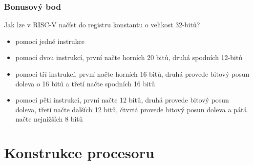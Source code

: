 \documentclass{beamer}
\begin{document}
\begin{frame}
\frametitle{Bonusový bod}

Jak lze v RISC-V načíst do registru konstantu o velikost 32-bitů?
\begin{itemize}
\item[A] pomocí jedné instrukce
\item[B] pomocí dvou instrukcí, první načte horních 20 bitů, druhá spodních 12-bitů
\item[C] pomocí tří instrukcí, první načte horních 16 bitů, druhá provede bitový posun doleva o 16 bitů a třetí načte spodních 16 bitů
\item[D] pomocí pěti instrukcí, první načte 12 bitů, druhá provede bitový posun doleva, třetí načte dalších 12 bitů, čtvrtá provede bitový posun doleva a pátá načte nejnižších 8 bitů
\end{itemize}
\end{frame}


\section{Konstrukce procesoru}








\end{document}

